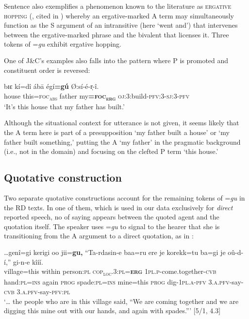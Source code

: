 \documentclass[output=paper,modfonts]{langscibook}
\begin{document}
Sentence  also exemplifies a phenomenon known to the literature as \textsc{ergative hopping }(\citealt[155]{Haviland1979}, cited in \citealt[1657]{Rumsey2010}) whereby an ergative-marked A term may simultaneously function as the S argument of an intransitive  (here ‘went and’) that intervenes between the ergative-marked  phrase and the bivalent  that licenses it. Three tokens of =\textit{gu} exhibit ergative hopping.

One of J\&C’s examples also falls into the pattern where P is promoted and constituent order is reversed:

\ea\label{ex:wolfe:12}
\gll bɪɛ kí=dî ábā égí\textbf{=gú} Ø:sí-é-r̩-î.\\
    house this=\textsc{foc}\textsc{\textsubscript{abs}} father my\textbf{=}\textsc{\textbf{foc}}\textsc{\textbf{\textsubscript{erg}}} \textsc{oj}:3:build-\textsc{pfv}:3-\textsc{sj}:3-\textsc{pfv}\\
\glt ‘It’s this house that my father has built.’ \citep[138]{Jakobi2006}
\z

Although the situational context for utterance  is not given, it seems likely that the A term here is part of a presupposition ‘my father built a house’ or ‘my father built something,’ putting the A ‘my father’ in the pragmatic background (i.e., not in the  domain) and focusing on the clefted P term ‘this house.’

\subsection{Quotative construction}\label{sec:wolfe:3.4}
Two separate quotative constructions account for the remaining tokens of =\textit{gu} in the RD texts. In one of them, which is used in our data exclusively for \textit{direct} reported speech, no  of saying appears between the quoted agent and the quotation itself. The speaker uses =\textit{gu} to signal to the hearer that she is transitioning from the A argument to a direct quotation, as in :


\ea\label{ex:wolfe:13}
\gll …genî=gi kerigi oo jii=\textbf{gu,} “Ta-rdasin-e baa=ru ere je korekk=tu ba=gi je oû-d-í,” gi-n-e kîíí.\\
     village=this within person:\textsc{pl} \textsc{cop}\textsc{\textsubscript{loc}}\textsc{.3:}\textsc{pl}=\textsc{\textbf{erg}} \textsc{1}\textsc{pl.p}-come.together-\textsc{cvb} hand:\textsc{pl}=\textsc{ins} again \textsc{prog} spade:\textsc{pl}=\textsc{ins} mine=this \textsc{prog} dig-\textsc{1pl}.\textsc{a}-\textsc{pfv} 3.\textsc{a}.\textsc{pfv}-say-\textsc{cvb} 3.\textsc{a}.\textsc{pfv}-say-\textsc{pfv}:\textsc{pl}\\
\glt ‘… the people who are in this village said, “We are coming together and we are digging this mine out with our hands, and again with spades.”’ [5/1, 4.3]
\z
\end{document}

